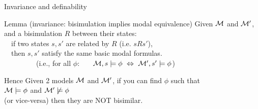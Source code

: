 \documentclass[aspectratio=169]{beamer}
\begin{document}
\begin{slide}{Invariance and definability}\label{s:31}
\small
\begin{block}{Lemma (invariance: bisimulation implies modal equivalence)}
Given  $\mathcal{M}$ and $\mathcal{M}'$, and a \alert{bisimulation} 
$R$ between their states:
\\[5mm]
~~\alert{if} two states $s, s'$ are related by $R$ (i.e. $s R s'$),\\
~~\alert{then} $s, s'$  satisfy the same basic modal formulas.\\
~~~~~~~~~\textcolor{black!50}{(i.e., for all $\phi$:
  ~~~$\mathcal{M},s \models \phi ~\Leftrightarrow~ \mathcal{M}',s' \models \phi$)}
 \end{block}


\begin{alertblock}{Hence}
  \centering
  Given 2 models $\mathcal{M}$ and $\mathcal{M'}$, if you can find $\phi$ such that
  \\[4mm]
  $\mathcal{M}\models \phi$ and $\mathcal{M'}\not \models \phi$
  \\[4mm]
  (or vice-versa) then they are NOT bisimilar.
  
\end{alertblock}

\end{slide}
\end{document}
